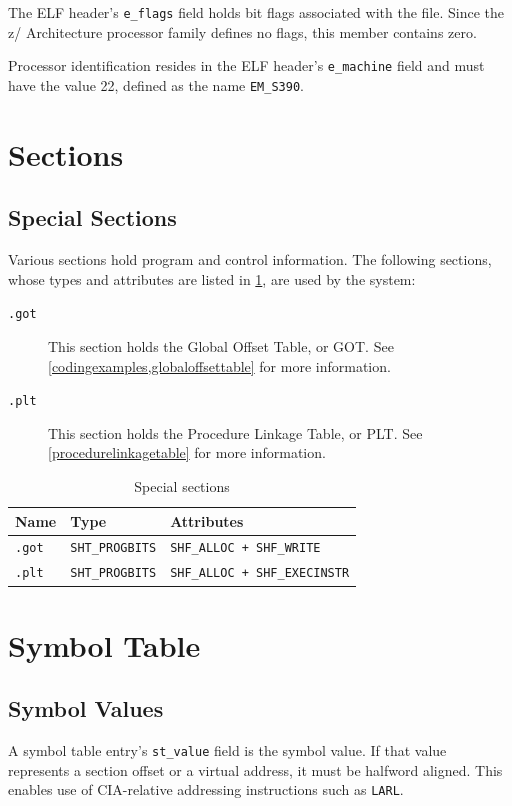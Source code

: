 \documentclass[USenglish,fontsize=11pt,twoside,%
  toc=bib,toc=idx,toc=graduated,numbers=noendperiod,
  bookmarks=true,
  bookmarksnumbered=true,
  bookmarksopen=true,
  bookmarksopenlevel=1,
  breaklinks=true,
  colorlinks=true,
  linkcolor=black,
  pdfpagelayout={TwoPageRight},
  pdfusetitle=true
]{scrreprt}
\newcommand{\ARCH}{z/\kern-1pt Ar\-chi\-tec\-ture}
\newcommand{\ARCH}{ESA/390}
\newenvironment{DIFnomarkup}{}{} %
\begin{document}
The ELF header's \texttt{e\_flags} field holds bit flags associated
with the file.  Since the \ARCH{} processor family defines no flags,
this member contains zero.

Processor identification resides in the ELF header's
\texttt{e\_machine} field and must have the value 22, defined as the
name \texttt{EM\_S390}.

\section{Sections}
\subsection{Special Sections}
Various sections hold program and control information.  The following
sections, whose types and attributes are listed in \cref{tab:sections},
are used by the system:
\begin{description}
\item[\texttt{.got}]  This
  section holds the Global Offset Table, or GOT\@.  See
  \cref{codingexamples,globaloffsettable} for more information.
\item[\texttt{.plt}]  This
  section holds the Procedure Linkage Table, or PLT.  See
  \cref{procedurelinkagetable} for more information.
\end{description}

\begin{table}
  \centering
  \begin{DIFnomarkup}
  \begin{tabular}{lll}
    \toprule
    Name & Type & Attributes \\
    \midrule
    \texttt{.got} & \texttt{SHT\_PROGBITS} &
    \texttt{SHF\_ALLOC + SHF\_WRITE} \\
    \texttt{.plt} & \texttt{SHT\_PROGBITS} &
    \texttt{SHF\_ALLOC + SHF\_EXECINSTR} \\
    \bottomrule
  \end{tabular}
  \end{DIFnomarkup}
  \caption{Special sections}
  \label{tab:sections}
\end{table}

\section{Symbol Table}
\subsection{Symbol Values}
\label{symbolvalues}
A symbol table entry's \texttt{st\_value} field is the symbol value.  If
that value represents a section offset or a virtual address, it must be
halfword aligned.  This enables use of CIA-relative addressing
instructions such as \texttt{LARL}.
\end{document}

